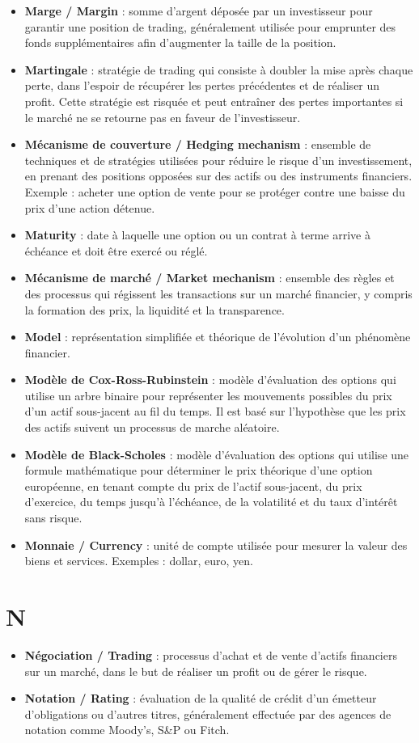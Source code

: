 \documentclass[a4paper,10pt]{article}
\begin{document}
\begin{multicols}{2}
\begin{itemize}
  \item \textbf{Marge / Margin} : somme d’argent déposée par un investisseur pour garantir une position de trading, généralement utilisée pour emprunter des fonds supplémentaires afin d’augmenter la taille de la position.
  \item \textbf{Martingale} : stratégie de trading qui consiste à doubler la mise après chaque perte, dans l’espoir de récupérer les pertes précédentes et de réaliser un profit. Cette stratégie est risquée et peut entraîner des pertes importantes si le marché ne se retourne pas en faveur de l’investisseur.
  \item \textbf{Mécanisme de couverture / Hedging mechanism} : ensemble de techniques et de stratégies utilisées pour réduire le risque d’un investissement, en prenant des positions opposées sur des actifs ou des instruments financiers. Exemple : acheter une option de vente pour se protéger contre une baisse du prix d’une action détenue.
  \item \textbf{Maturity} : date à laquelle une option ou un contrat à terme arrive à échéance et doit être exercé ou réglé.
  \item \textbf{Mécanisme de marché / Market mechanism} : ensemble des règles et des processus qui régissent les transactions sur un marché financier, y compris la formation des prix, la liquidité et la transparence.
  \item \textbf{Model} : représentation simplifiée et théorique de l’évolution d’un phénomène financier.
  \item \textbf{Modèle de Cox-Ross-Rubinstein} : modèle d’évaluation des options qui utilise un arbre binaire pour représenter les mouvements possibles du prix d’un actif sous-jacent au fil du temps. Il est basé sur l’hypothèse que les prix des actifs suivent un processus de marche aléatoire.
  \item \textbf{Modèle de Black-Scholes} : modèle d’évaluation des options qui utilise une formule mathématique pour déterminer le prix théorique d’une option européenne, en tenant compte du prix de l’actif sous-jacent, du prix d’exercice, du temps jusqu’à l’échéance, de la volatilité et du taux d’intérêt sans risque.
  \item \textbf{Monnaie / Currency} : unité de compte utilisée pour mesurer la valeur des biens et services. Exemples : dollar, euro, yen.
\end{itemize}

\section*{N}
\begin{itemize}
  \item \textbf{Négociation / Trading} : processus d’achat et de vente d’actifs financiers sur un marché, dans le but de réaliser un profit ou de gérer le risque.
  \item \textbf{Notation / Rating} : évaluation de la qualité de crédit d’un émetteur d’obligations ou d’autres titres, généralement effectuée par des agences de notation comme Moody’s, S\&P ou Fitch.
\end{itemize}


\end{multicols}
\end{document}
